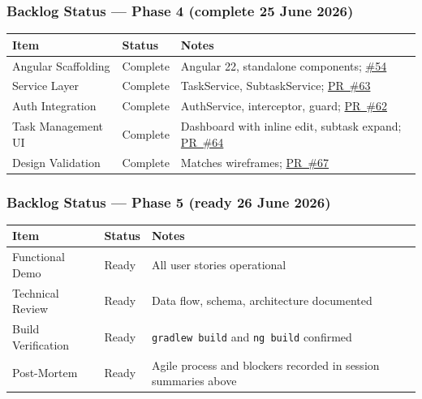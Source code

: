 \subsubsection{Backlog Status --- Phase 4 (complete 25 June 2026)}
\begin{tabularx}{\textwidth}{@{} l l X @{}}
  \toprule
  \textbf{Item} & \textbf{Status} & \textbf{Notes} \\
  \midrule
  Angular Scaffolding & Complete & Angular 22, standalone components; \href{https://github.com/JaehoonSong12/PEP-Team02-TheDJs/issues/54}{\#54} \\
  Service Layer       & Complete & TaskService, SubtaskService; \href{https://github.com/JaehoonSong12/PEP-Team02-TheDJs/pull/63}{PR~\#63} \\
  Auth Integration    & Complete & AuthService, interceptor, guard; \href{https://github.com/JaehoonSong12/PEP-Team02-TheDJs/pull/62}{PR~\#62} \\
  Task Management UI  & Complete & Dashboard with inline edit, subtask expand; \href{https://github.com/JaehoonSong12/PEP-Team02-TheDJs/pull/64}{PR~\#64} \\
  Design Validation   & Complete & Matches wireframes; \href{https://github.com/JaehoonSong12/PEP-Team02-TheDJs/pull/67}{PR~\#67} \\
  \bottomrule
\end{tabularx}

\subsubsection{Backlog Status --- Phase 5 (ready 26 June 2026)}
\begin{tabularx}{\textwidth}{@{} l l X @{}}
  \toprule
  \textbf{Item} & \textbf{Status} & \textbf{Notes} \\
  \midrule
  Functional Demo     & Ready & All user stories operational \\
  Technical Review    & Ready & Data flow, schema, architecture documented \\
  Build Verification  & Ready & \texttt{gradlew build} and \texttt{ng build} confirmed \\
  Post-Mortem         & Ready & Agile process and blockers recorded in session summaries above \\
  \bottomrule
\end{tabularx}

\newpage
